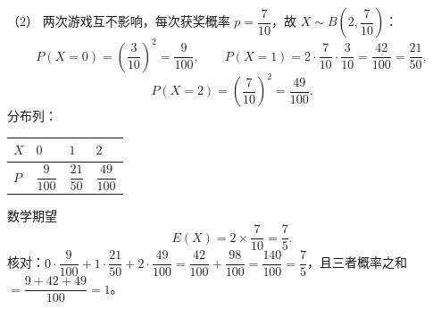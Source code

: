 \begin{answer}
（2） 两次游戏互不影响，每次获奖概率 $p=\dfrac7{10}$，故 $X\sim B\left(2,\dfrac7{10}\right)$：
\nopagebreak[4]
\[P(X=0)=\left(\frac3{10}\right)^2=\frac9{100},\qquad P(X=1)=2\cdot\frac7{10}\cdot\frac3{10}=\frac{42}{100}=\frac{21}{50},\]
\nopagebreak[4]
\[P(X=2)=\left(\frac7{10}\right)^2=\frac{49}{100}.\]
分布列：

\begin{center}
\begin{tabular}{llll}
\toprule
$X$ & $0$ & $1$ & $2$ \\
\midrule
$P$ & $\dfrac{9}{100}$ & $\dfrac{21}{50}$ & $\dfrac{49}{100}$ \\
\bottomrule
\end{tabular}
\end{center}

数学期望
\nopagebreak[4]
\[E(X)=2\times\frac7{10}=\frac75.\]
核对：$0\cdot\dfrac9{100}+1\cdot\dfrac{21}{50}+2\cdot\dfrac{49}{100}=\dfrac{42}{100}+\dfrac{98}{100}=\dfrac{140}{100}=\dfrac75$，且三者概率之和 $=\dfrac{9+42+49}{100}=1$。


\end{answer}

